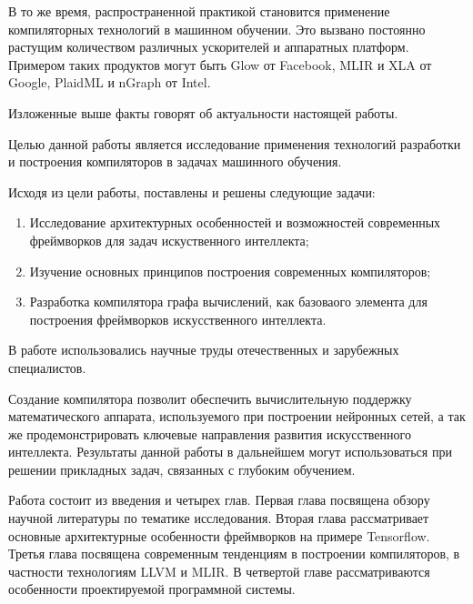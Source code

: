 В то же время, распространенной практикой становится применение компиляторных
технологий в машинном обучении. Это вызвано постоянно растущим количеством
различных ускорителей и аппаратных платформ. Примером таких продуктов могут быть
Glow от Facebook, MLIR и XLA от Google, PlaidML и nGraph от Intel.

Изложенные выше факты говорят об актуальности настоящей работы.

Целью данной работы является исследование применения технологий разработки и
построения компиляторов в задачах машинного обучения.

Исходя из цели работы, поставлены и решены следующие задачи:
\begin{enumerate}
\item Исследование архитектурных особенностей и возможностей современных
      фреймворков для задач искуственного интеллекта;
\item Изучение основных принципов построения современных компиляторов;
\item Разработка компилятора графа вычислений, как базоваого элемента для
      построения фреймворков искусственного интеллекта.
\end{enumerate}

В работе использовались научные труды отечественных и зарубежных специалистов.

Создание компилятора позволит обеспечить вычислительную поддержку математического
аппарата, используемого при построении нейронных сетей, а так же продемонстрировать
ключевые направления развития искусственного интеллекта. Результаты данной
работы в дальнейшем могут использоваться при решении прикладных задач, связанных
с глубоким обучением.

Работа состоит из введения и четырех глав. Первая глава посвящена обзору
научной литературы по тематике исследования. Вторая глава рассматривает основные
архитектурные особенности фреймворков на примере Tensorflow. Третья глава
посвящена современным тенденциям в построении компиляторов, в частности технологиям
LLVM и MLIR. В четвертой главе рассматриваются особенности проектируемой
программной системы.
